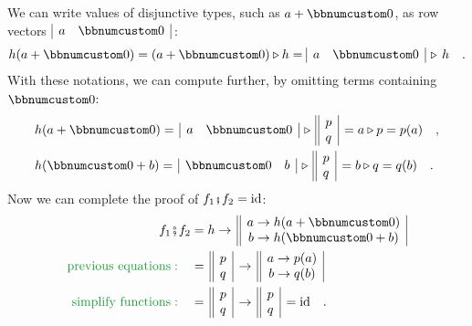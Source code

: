 We can write values of disjunctive types, such as $a+\bbnum 0$, as
row vectors $\begin{array}{|cc|}
a & \bbnum 0\end{array}\,$:
\begin{equation}
h(a+\bbnum 0)=(a+\bbnum 0)\triangleright h=\begin{array}{|cc|}
a & \bbnum 0\end{array}\,\triangleright\,h\quad.\label{eq:forward-notation-}
\end{equation}
With these notations, we can compute further, by omitting terms containing
$\bbnum 0$:
\begin{align*}
 & h(a+\bbnum 0)=\,\begin{array}{|cc|}
a & \bbnum 0\end{array}\,\triangleright\,\begin{array}{||c|}
p\\
q
\end{array}\,=a\triangleright p=p(a)\quad,\\
 & h(\bbnum 0+b)=\,\begin{array}{|cc|}
\bbnum 0 & b\end{array}\,\triangleright\,\begin{array}{||c|}
p\\
q
\end{array}\,=b\triangleright q=q(b)\quad.
\end{align*}
Now we can complete the proof of $f_{1}\bef f_{2}=\text{id}$:
\begin{align*}
f_{1}\bef f_{2} & =h\rightarrow\,\begin{array}{||c|}
a\rightarrow h(a+\bbnum 0)\\
b\rightarrow h(\bbnum 0+b)
\end{array}\\
{\color{greenunder}\text{previous equations}:}\quad & =\,\begin{array}{||c|}
p\\
q
\end{array}\,\rightarrow\,\begin{array}{||c|}
a\rightarrow p(a)\\
b\rightarrow q(b)
\end{array}\\
{\color{greenunder}\text{simplify functions}:}\quad & =\,\begin{array}{||c|}
p\\
q
\end{array}\,\rightarrow\,\begin{array}{||c|}
p\\
q
\end{array}\,=\text{id}\quad.
\end{align*}

